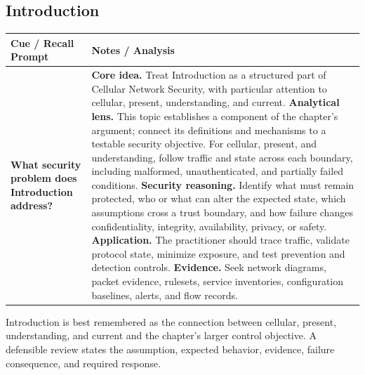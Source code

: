 \documentclass[11pt]{article}
\newcommand{\CornellHeader}{%
\rowcolor{Navy}\color{white}\bfseries Cue / Recall Prompt & \color{white}\bfseries Notes / Analysis\\\hline}
\newcommand{\CornellRow}[2]{%
\cellcolor{CueGray}\RaggedRight\textbf{#1} & \RaggedRight #2\\\hline}
\begin{document}
\subsection*{Introduction}
\begin{longtable}{>{\RaggedRight\arraybackslash}p{}|>{\RaggedRight\arraybackslash}p{}}
\CornellHeader
\CornellRow{What security problem does Introduction address?}{\textbf{Core idea.} Treat Introduction as a structured part of Cellular Network Security, with particular attention to cellular, present, understanding, and current. \textbf{Analytical lens.} This topic establishes a component of the chapter's argument; connect its definitions and mechanisms to a testable security objective. For cellular, present, and understanding, follow traffic and state across each boundary, including malformed, unauthenticated, and partially failed conditions. \textbf{Security reasoning.} Identify what must remain protected, who or what can alter the expected state, which assumptions cross a trust boundary, and how failure changes confidentiality, integrity, availability, privacy, or safety. \textbf{Application.} The practitioner should trace traffic, validate protocol state, minimize exposure, and test prevention and detection controls. \textbf{Evidence.} Seek network diagrams, packet evidence, rulesets, service inventories, configuration baselines, alerts, and flow records.}
\end{longtable}
\begin{topicsummary}
Introduction is best remembered as the connection between cellular, present, understanding, and current and the chapter's larger control objective. A defensible review states the assumption, expected behavior, evidence, failure consequence, and required response.
\end{topicsummary}
\end{document}
